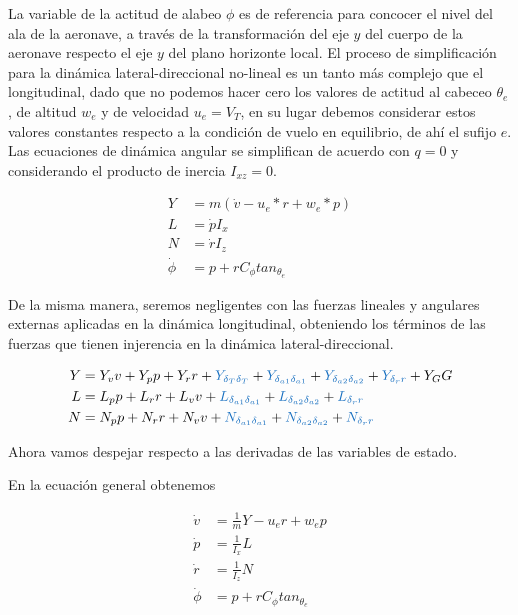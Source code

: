 La variable de la actitud de alabeo $\phi$ es de referencia para concocer el nivel del ala de la aeronave, a través de la transformación del eje $y$ del cuerpo de la aeronave respecto el eje $y$ del plano horizonte local. El proceso de simplificación para la dinámica lateral-direccional no-lineal es un tanto más complejo que el longitudinal, dado que no podemos hacer cero los valores de actitud al cabeceo $\theta_{e}$, de altitud $w_{e}$ y de velocidad $u_{e}=V_{T}$, en su lugar debemos considerar estos valores constantes respecto a la condición de vuelo en equilibrio, de ahí el sufijo $e$.
Las ecuaciones de dinámica angular se simplifican de acuerdo con $q=0$ y \cite{Mohammad2020} considerando el producto de inercia $I_{xz}=0$. 

\begin{align} 
Y &= m (\dot v - u_{e}*r + w_{e}*p)\\
L &= \dot p I_x \\
N &=  \dot r I_z \\
\dot \phi &= p + r C_{\phi} tan_{\theta_{e}}
\end{align}

De la misma manera, seremos negligentes con las fuerzas lineales y angulares externas aplicadas en la dinámica longitudinal, obteniendo los términos de las fuerzas que tienen injerencia en la dinámica lateral-direccional. 

\begin{align}
    Y &= Y_{v} v + Y_{p}p + Y_{r} r + \textcolor{RoyalBlue}{Y_{\delta_{T} \delta_{T}}} + \textcolor{RoyalBlue}{Y_{\delta_{a1} \delta_{a1}}} + \textcolor{RoyalBlue}{Y_{\delta_{a2} \delta_{a2}}}  + \textcolor{RoyalBlue}{Y_{\delta_{r}r}} + Y_{G} G \\
    L &= L_{p}p + L_{r}r + L_{v}v + \textcolor{RoyalBlue}{L_{\delta_{a1} \delta_{a1}}} + \textcolor{RoyalBlue}{L_{\delta_{a2} \delta_{a2}}}  + \textcolor{RoyalBlue}{L_{\delta_{r}r}} \\
    N &= N_{p}p + N_{r}r + N_{v}v + \textcolor{RoyalBlue}{N_{\delta_{a1} \delta_{a1}}} + \textcolor{RoyalBlue}{N_{\delta_{a2} \delta_{a2}}}  + \textcolor{RoyalBlue}{N_{\delta_{r}r}}
\end{align}


Ahora vamos despejar respecto a las derivadas de las variables de estado. 

En la ecuación general obtenemos

\begin{align}
    \dot v & = \frac{1}{m}Y - u_{e} r + w_{e} p \\
    \dot p & = \frac{1}{I_x}L \\
    \dot r & = \frac{1}{I_z}N \\
    \dot \phi &= p + r C_{\phi} tan_{\theta_{e}}
\end{align}


